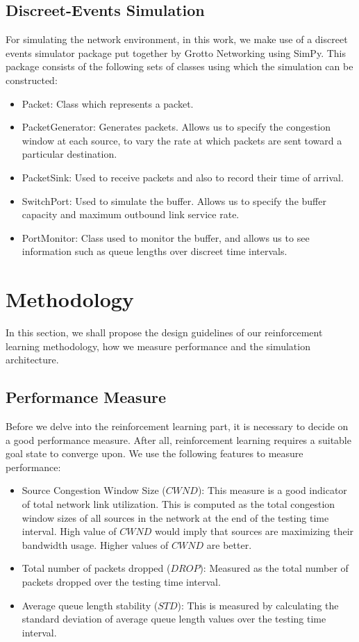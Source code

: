 \documentclass[conference, 10pt]{IEEEtran}
\begin{document}
\subsection{Discreet-Events Simulation}
\label{sec:back:discreet}
For simulating the network environment, in this work, we make use of a discreet events simulator package put together by Grotto Networking \cite{grotto} using SimPy. This package consists of the following sets of classes using which the simulation can be constructed:
\begin{itemize}
    \item Packet: Class which represents a packet. 
    \item PacketGenerator: Generates packets. Allows us to specify the congestion window at each source, to vary the rate at which packets are sent toward a particular destination.
    \item PacketSink: Used to receive packets and also to record their time of arrival.
    \item SwitchPort: Used to simulate the buffer. Allows us to specify the buffer capacity and maximum outbound link service rate.
    \item PortMonitor: Class used to monitor the buffer, and allows us to see information such as queue lengths over discreet time intervals.
\end{itemize}

\section{Methodology}
\label{sec:prop}
In this section, we shall propose the design guidelines of our reinforcement learning methodology, how we measure performance and the simulation architecture.

\subsection{Performance Measure}
\label{sec:prop:indexing}
Before we delve into the reinforcement learning part, it is necessary to decide on a good performance measure. After all, reinforcement learning requires a suitable goal state to converge upon. We use the following features to measure performance:
\begin{itemize}
    \item Source Congestion Window Size ($CWND$): This measure is a good indicator of total network link utilization. This is computed as the total congestion window sizes of all sources in the network at the end of the testing time interval. High value of $CWND$ would imply that sources are maximizing their bandwidth usage. Higher values of $CWND$ are better.
    \item Total number of packets dropped ($DROP$): Measured as the total number of packets dropped over the testing time interval.
    \item Average queue length stability ($STD$): This is measured by calculating the standard deviation of average queue length values over the testing time interval.
\end{itemize}
\end{document}

